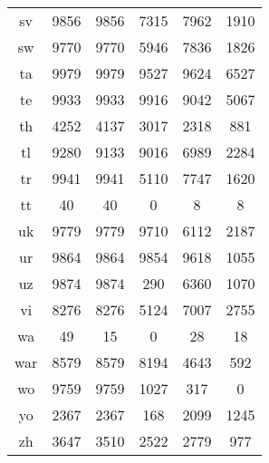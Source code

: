 \begin{figure}[h]
\begin{tabular}{cccccc}
sv&9856&9856&7315&7962&1910\\
sw&9770&9770&5946&7836&1826\\
ta&9979&9979&9527&9624&6527\\
te&9933&9933&9916&9042&5067\\
th&4252&4137&3017&2318&881\\
tl&9280&9133&9016&6989&2284\\
tr&9941&9941&5110&7747&1620\\
tt&40&40&0&8&8\\
uk&9779&9779&9710&6112&2187\\
ur&9864&9864&9854&9618&1055\\
uz&9874&9874&290&6360&1070\\
vi&8276&8276&5124&7007&2755\\
wa&49&15&0&28&18\\
war&8579&8579&8194&4643&592\\
wo&9759&9759&1027&317&0\\
yo&2367&2367&168&2099&1245\\
zh&3647&3510&2522&2779&977\\
\hline\hline
\end{tabular}
\end{figure}
